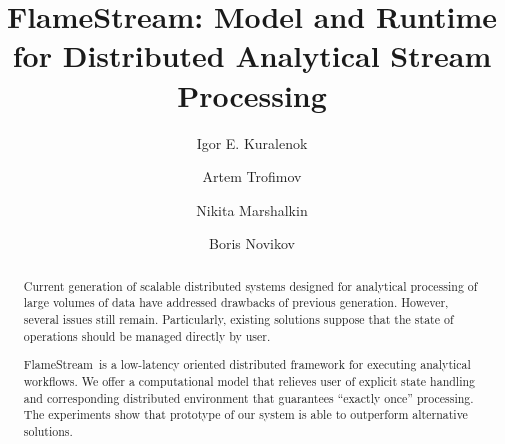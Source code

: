 \documentclass[sigconf]{acmart}
\theoremstyle{remark}
\newcommand {\FlameStream} {FlameStream}
\begin{document}
\title {\FlameStream: Model and Runtime for Distributed Analytical Stream Processing}


\author{Igor E. Kuralenok}

\author{Artem Trofimov}

\author{Nikita Marshalkin}

\author{Boris Novikov}




\begin{abstract}
Current generation of scalable distributed systems designed for analytical processing of large volumes of data have addressed drawbacks of previous generation. However, several issues still remain. Particularly, existing solutions suppose that the state of operations should be managed directly by user.

\FlameStream\ is a low-latency oriented distributed framework for executing analytical workflows. We offer a computational model that relieves user of explicit state handling and corresponding distributed environment that guarantees ``exactly once'' processing. The experiments show that prototype of our system is able to outperform alternative solutions.
\end {abstract}
\end{document}
